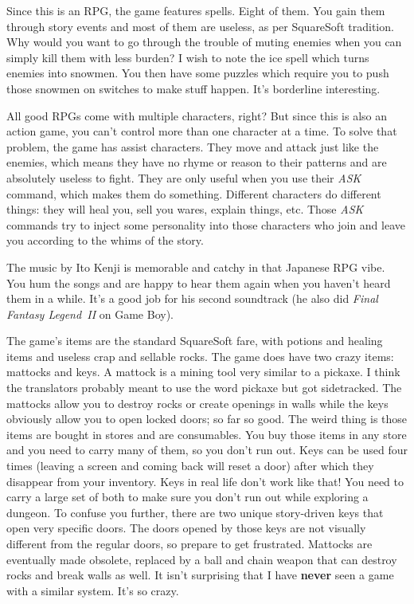 \documentclass{book}
\begin{document}
Since this is an RPG, the game features spells. Eight of them. You gain them through story events and most of them are useless, as per SquareSoft tradition. Why would you want to go through the trouble of muting enemies when you can simply kill them with less burden? I wish to note the ice spell which turns enemies into snowmen. You then have some puzzles which require you to push those snowmen on switches to make stuff happen. It’s borderline interesting.\par
All good RPGs come with multiple characters, right? But since this is also an action game, you can’t control more than one character at a time. To solve that problem, the game has assist characters. They move and attack just like the enemies, which means they have no rhyme or reason to their patterns and are absolutely useless to fight. They are only useful when you use their \emph{ASK} command, which makes them do something. Different characters do different things: they will heal you, sell you wares, explain things, etc. Those \emph{ASK} commands try to inject some personality into those characters who join and leave you according to the whims of the story.\par
The music by Ito Kenji is memorable and catchy in that Japanese RPG vibe. You hum the songs and are happy to hear them again when you haven’t heard them in a while. It’s a good job for his second soundtrack (he also did \emph{Final Fantasy Legend~II} on Game Boy).\par
The game’s items are the standard SquareSoft fare, with potions and healing items and useless crap and sellable rocks. The game does have two crazy items: mattocks and keys. A mattock is a mining tool very similar to a pickaxe. I think the translators probably meant to use the word pickaxe but got sidetracked. The mattocks allow you to destroy rocks or create openings in walls while the keys obviously allow you to open locked doors; so far so good. The weird thing is those items are bought in stores and are consumables. You buy those items in any store and you need to carry many of them, so you don’t run out. Keys can be used four times (leaving a screen and coming back will reset a door) after which they disappear from your inventory. Keys in real life don’t work like that! You need to carry a large set of both to make sure you don’t run out while exploring a dungeon. To confuse you further, there are two unique story-driven keys that open very specific doors. The doors opened by those keys are not visually different from the regular doors, so prepare to get frustrated. Mattocks are eventually made obsolete, replaced by a ball and chain weapon that can destroy rocks and break walls as well. It isn’t surprising that I have \textbf{never} seen a game with a similar system. It’s so crazy.\par
\end{document}

